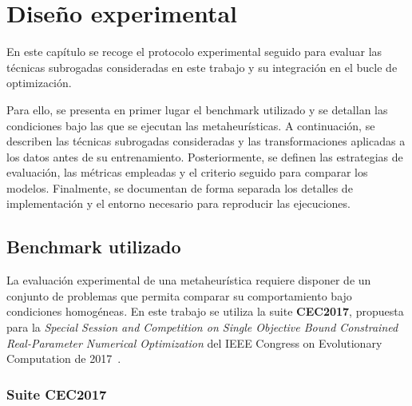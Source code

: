 \chapter{Diseño experimental}
\label{chap:metodologia_experimental}






En este capítulo se recoge el protocolo experimental seguido para evaluar las técnicas subrogadas consideradas en este trabajo y su integración en el bucle de optimización.

Para ello, se presenta en primer lugar el benchmark utilizado y se detallan las condiciones bajo las que se ejecutan las metaheurísticas. A continuación, se describen las técnicas subrogadas consideradas y las transformaciones aplicadas a los datos antes de su entrenamiento.
Posteriormente, se definen las estrategias de evaluación, las métricas empleadas y el criterio seguido para comparar los modelos. Finalmente, se documentan de forma separada los detalles de implementación y el entorno necesario para reproducir las ejecuciones.

\section{Benchmark utilizado}
\label{sec:benchmark}

La evaluación experimental de una metaheurística requiere disponer de un
conjunto de problemas que permita comparar su comportamiento bajo condiciones
homogéneas. En este trabajo se utiliza la suite \textbf{CEC2017}, propuesta para la
\textit{Special Session and Competition on Single Objective Bound Constrained
    Real-Parameter Numerical Optimization} del IEEE Congress on Evolutionary
Computation de 2017~\cite{awad2017cec2017}.

\subsection{Suite CEC2017}
\label{subsec:suite_cec2017}

